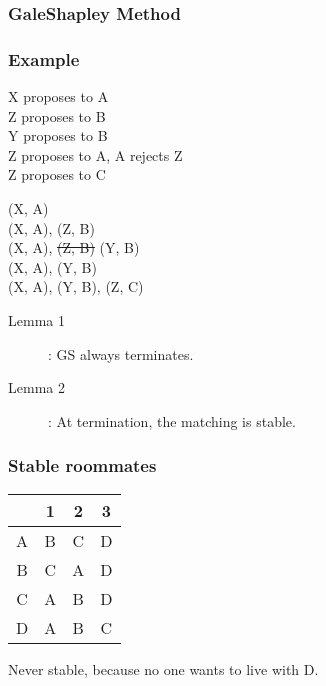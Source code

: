 \subsubsection*{Gale{\textendash}Shapley Method}
\begin{algorithmic}
\EndIf
\EndWhile
\end{algorithmic}

\subsubsection*{Example}
\begin{multicols}{2}
X proposes to A\\
Z proposes to B\\
Y proposes to B\\
Z proposes to A, A rejects Z\\
Z proposes to C
\columnbreak

(X, A)\\
(X, A), (Z, B)\\
(X, A), \sout{(Z, B)} (Y, B)\\
(X, A), (Y, B)\\
(X, A), (Y, B), (Z, C)
\end{multicols}

\begin{description}
\item[Lemma 1]: G{\textendash}S always terminates.
\item[Lemma 2]: At termination, the matching is stable.
\end{description}

\subsubsection*{Stable roommates}
\begin{tabular}{c|c c c}
  & 1 & 2 & 3\\ \hline
A & B & C & D\\
B & C & A & D\\
C & A & B & D\\
D & A & B & C
\end{tabular}

Never stable, because no one wants to live with D.\\

